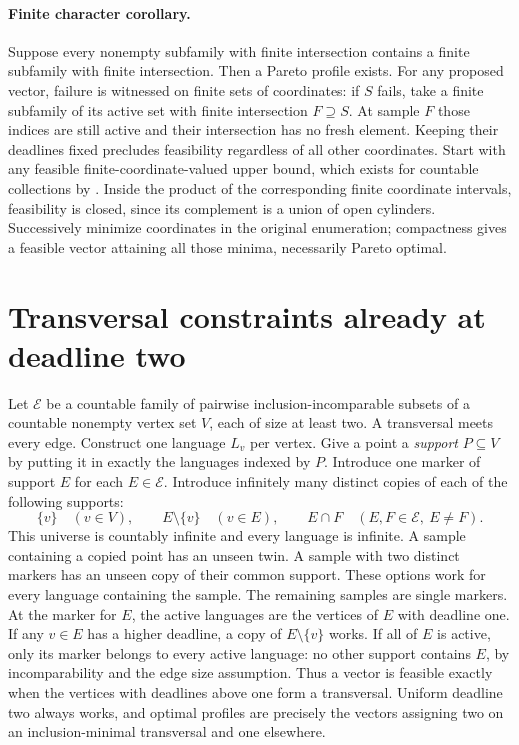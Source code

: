 \documentclass[11pt]{article}
\begin{document}
\paragraph{Finite character corollary.}
Suppose every nonempty subfamily with finite intersection contains a finite subfamily with finite intersection. Then a Pareto profile exists. For any proposed vector, failure is witnessed on finite sets of coordinates: if $S$ fails, take a finite subfamily of its active set with finite intersection $F\supseteq S$. At sample $F$ those indices are still active and their intersection has no fresh element. Keeping their deadlines fixed precludes feasibility regardless of all other coordinates. Start with any feasible finite-coordinate-valued upper bound, which exists for countable collections by \cite{cp}. Inside the product of the corresponding finite coordinate intervals, feasibility is closed, since its complement is a union of open cylinders. Successively minimize coordinates in the original enumeration; compactness gives a feasible vector attaining all those minima, necessarily Pareto optimal.

\section{Transversal constraints already at deadline two}
Let $\mathcal E$ be a countable family of pairwise inclusion-incomparable subsets of a countable nonempty vertex set $V$, each of size at least two. A transversal meets every edge. Construct one language $L_v$ per vertex. Give a point a \emph{support} $P\subseteq V$ by putting it in exactly the languages indexed by $P$. Introduce one marker of support $E$ for each $E\in\mathcal E$. Introduce infinitely many distinct copies of each of the following supports:
\[
 \{v\}\quad(v\in V),\qquad E\setminus\{v\}\quad(v\in E),\qquad
 E\cap F\quad(E,F\in\mathcal E,\ E\ne F).
\]
This universe is countably infinite and every language is infinite. A sample containing a copied point has an unseen twin. A sample with two distinct markers has an unseen copy of their common support. These options work for every language containing the sample. The remaining samples are single markers. At the marker for $E$, the active languages are the vertices of $E$ with deadline one. If any $v\in E$ has a higher deadline, a copy of $E\setminus\{v\}$ works. If all of $E$ is active, only its marker belongs to every active language: no other support contains $E$, by incomparability and the edge size assumption. Thus a vector is feasible exactly when the vertices with deadlines above one form a transversal. Uniform deadline two always works, and optimal profiles are precisely the vectors assigning two on an inclusion-minimal transversal and one elsewhere.
\end{document}
